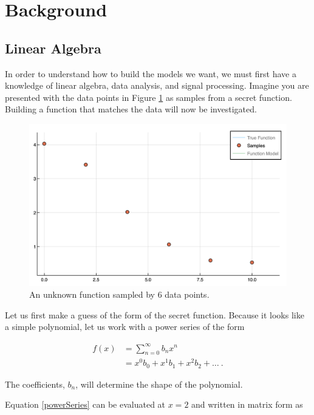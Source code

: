 \section{Background}\label{Sect:background}
\subsection{Linear Algebra}\label{Sect:linearAlgebra}
In order to understand how to build the models we want, we must first have a knowledge of linear algebra, data analysis, and signal processing. Imagine you are presented with the data points in Figure \ref{figFunc1Samples} as samples from a secret function. Building a function that matches the data will now be investigated.

\begin{figure}[h]
\includegraphics[scale = 0.4]{Figures/func1Samples}
\caption{An unknown function sampled by 6 data points.
\label{figFunc1Samples}} 
\end{figure}

\par Let us first make a guess of the form of the secret function. Because it looks like a simple polynomial, let us work with a power series of the form

\begin{align}
f(x) &= \sum_{n=0}^\infty b_n x^n
	\label{powerSum}\\ 
&= x^0b_0 + x^1b_1 + x^2b_2 + \ldots\ .
	\label{powerSeries}
\end{align}

\par The coefficients, $b_n$, will determine the shape of the polynomial.

Equation \ref{powerSeries} can be evaluated at $x=2$ and written in matrix form as

